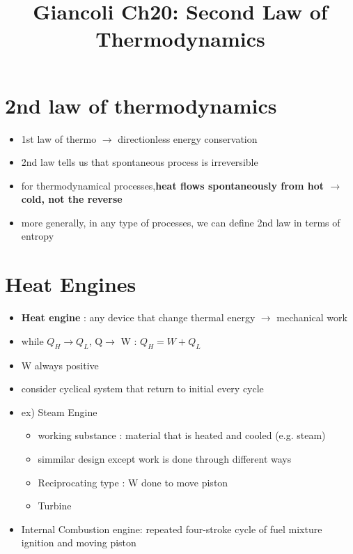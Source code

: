 \documentclass[12 pt , twoside, letterpaper] {article}
\begin{document}
\title{Giancoli Ch20: Second Law of Thermodynamics}
\date{}
\maketitle
\vspace{-50pt}
	\section{2nd law of thermodynamics}
		\begin{itemize}
			\item 1st law of thermo $\rightarrow$ directionless energy conservation
			\item 2nd law tells us that spontaneous process is irreversible
			\item for thermodynamical processes,\textbf{heat flows spontaneously from hot $\rightarrow$ cold, not the reverse}
			\item more generally, in any type of processes, we can define 2nd law in terms of entropy 
			
			
		\end{itemize}				
	
	\section{Heat Engines}
		\begin{itemize}
				\item \textbf{Heat engine} : any device that change thermal energy $\rightarrow$ mechanical work
				\item while $Q_H \rightarrow Q_L$, Q$\rightarrow$ W : $Q_H= W+Q_L$
				\item W always positive
				\item consider cyclical system that return to initial every cycle
				\item ex) Steam Engine
					\begin{itemize}
						\item working substance : material that is heated and cooled  (e.g. steam)
						\item simmilar design except work is done through different ways
						\item Reciprocating type  : W done to move piston
						\item Turbine 
					\end{itemize}
				\item Internal Combustion engine: repeated four-stroke cycle of fuel mixture ignition and moving piston
		\end{itemize}			
	
\end{document}
